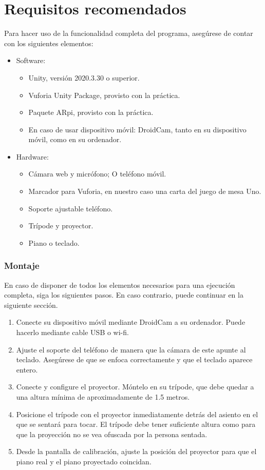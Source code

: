 \section{Requisitos recomendados}
Para hacer uso de la funcionalidad completa del programa, asegúrese de contar con los siguientes elementos:
\begin{itemize}
	\item Software: 
	\begin{itemize}
		\item Unity, versión 2020.3.30 o superior.
		\item Vuforia Unity Package, provisto con la práctica.
		\item Paquete ARpi, provisto con la práctica.
		\item En caso de usar dispositivo móvil: DroidCam, tanto en su dispositivo móvil, como en su ordenador.
	\end{itemize}
	\item Hardware:
	\begin{itemize}
		\item Cámara web y micrófono; O teléfono móvil.
		\item Marcador para Vuforia, en nuestro caso una carta del juego de mesa Uno.
		\item Soporte ajustable teléfono.
		\item Trípode y proyector.
		\item Piano o teclado.
	\end{itemize}
\end{itemize}

\subsubsection{Montaje}
En caso de disponer de todos los elementos necesarios para una ejecución completa, siga los siguientes pasos. En caso contrario, 
puede continuar en la siguiente sección.

\begin{enumerate}
	\item Conecte su dispositivo móvil mediante DroidCam a su ordenador. Puede hacerlo mediante cable USB o wi-fi.
	\item Ajuste el soporte del teléfono de manera que la cámara de este apunte al teclado. Asegúrese de que se enfoca correctamente 
	y que el teclado aparece entero.
	\item Conecte y configure el proyector. Móntelo en su trípode, que debe quedar a una altura mínima de aproximadamente de 1.5 metros.
	\item Posicione el trípode con el proyector inmediatamente detrás del asiento en el que se sentará para tocar. El trípode debe tener 
	suficiente altura como para que la proyección no se vea ofuscada por la persona sentada.  
	\item Desde la pantalla de calibración, ajuste la posición del proyector para que el piano real y el piano proyectado coincidan. 
\end{enumerate}

